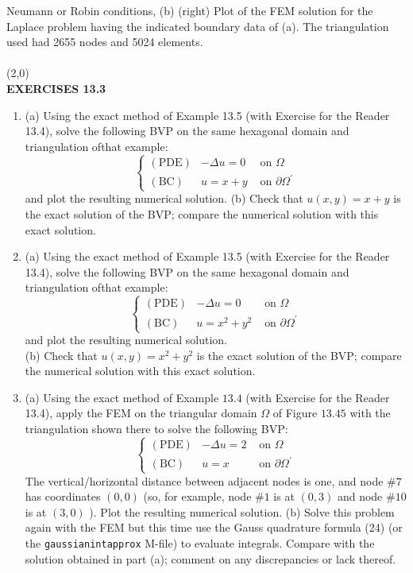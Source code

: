 \documentclass[../main.tex]{subfiles}
\begin{document}
Neumann or Robin conditions, (b) (right) Plot of the FEM solution for the Laplace problem 
having the indicated boundary data of (a). The triangulation used had 2655 nodes and 
5024 elements. 
\\
\\
\line(2,0){\textwidth}
\\
\textbf{EXERCISES 13.3}
\begin{enumerate}
	\item (a) Using the exact method of Example 13.5 (with Exercise for the Reader 13.4), solve the 
following BVP on the same hexagonal domain and triangulation ofthat example: 
$$
\left\{\begin{array}{lll}
(\mathrm{PDE}) & -\Delta u=0 & \text { on } \Omega \\
(\mathrm{BC}) & u=x+y & \text { on } \partial \Omega^{\prime}
\end{array}\right.
$$
and plot the resulting numerical solution.
(b) Check that $u(x, y)=x+y$ is the exact solution of the BVP; compare the numerical solution with this exact solution.
	\item (a) Using the exact method of Example 13.5 (with Exercise for the Reader 13.4), solve the 
following BVP on the same hexagonal domain and triangulation ofthat example: 
$$
\left\{\begin{array}{lll}
(\mathrm{PDE}) & -\Delta u=0 & \text { on } \Omega \\
(\mathrm{BC}) & u=x^{2}+y^{2} & \text { on } \partial \Omega^{\prime}
\end{array}\right.
$$
and plot the resulting numerical solution.
\\
(b) Check that $u(x, y)=x^{2}+y^{2}$ is the exact solution of the BVP; compare the numerical solution with this exact solution.
	\item (a) Using the exact method of Example $13.4$ (with Exercise for the Reader 13.4), apply the FEM on the triangular domain $\Omega$ of Figure $13.45$ with the triangulation shown there to solve the following BVP:
	$$
\left\{\begin{array}{lll}
(\mathrm{PDE}) & -\Delta u=2 & \text { on } \Omega \\
(\mathrm{BC}) & u=x & \text { on } \partial \Omega^{\prime}
\end{array}\right.
$$
The vertical/horizontal distance between adjacent nodes is one, and node $\# 7$ has coordinates $(0,0)$ (so, for example, node $\# 1$ is at $(0,3)$ and node $\# 10$ is at $(3,0)$ ). Plot the resulting numerical solution.
(b) Solve this problem again with the FEM but this time use the Gauss quadrature formula (24) (or the \texttt{gaussianintapprox} M-file) to evaluate integrals. Compare with the solution obtained in part (a); comment on any discrepancies or lack thereof. 

\end{enumerate}
\end{document}

